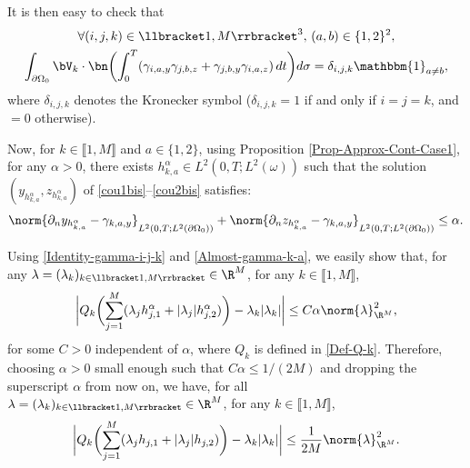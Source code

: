 It is then easy to check that
\begin{multline}
\label{Identity-gamma-i-j-k}
\forall (i,j,k) \in \llbracket 1,M \rrbracket^3, \, (a,b) \in \{1,2\}^2,
\\
\int_{\partial \Omega_0} \bV_k \cdot \bn \biggl(\int_0^T (\gamma_{i,a, y} \gamma_{j,b,z} + \gamma_{j,b,y} \gamma_{i,a,z}) \, dt \biggr) d \sigma
= \delta_{i,j,k} \mathbbm{1}_{a \neq b},
\end{multline}
where $ \delta_{i,j,k}$ denotes {the Kronecker symbol ($\delta_{i,j,k} = 1$ if and only if $i = j = k$, and $=0$ otherwise).}

Now, for $k \in \llbracket 1,M \rrbracket $ and $a \in \{1, 2\}$, using Proposition \ref{Prop-Approx-Cont-Case1}, for any ${\alpha} >0$, there \hbox{exists} $h_{k,a}^{{\alpha}}\!\in\!L^2(0,T; L^2(\omega))$ such that the solution $(y_{h_{k,a}^{\alpha}}, z_{h_{k,a}^{\alpha}})$ of \eqref{cou1bis}--\eqref{cou2bis} satisfies:
\begin{equation}
\label{Almost-gamma-k-a}
\norm{\partial_n y_{h_{k,a}^{\alpha}} - \gamma_{k,a,y}}_{L^2(0,T; L^2(\partial \Omega_0))}
+
\norm{\partial_n z_{h_{k,a}^{\alpha}} - \gamma_{k,a,y}}_{L^2(0,T; L^2(\partial \Omega_0))}
\leq
{\alpha}.
\end{equation}

Using \eqref{Identity-gamma-i-j-k} and \eqref{Almost-gamma-k-a}, we easily show that, for any $\lambda = (\lambda_{k})_{k \in \llbracket 1,M \rrbracket } \in \R^{M}$, for any $k \in \llbracket 1,M \rrbracket $,
\[
\biggl|
Q_k \biggl(\sum_{j = 1}^M (\lambda_{j} h_{j,1}^{\alpha} + |\lambda_{j}| h_{j,2}^{\alpha}) \biggr)
-
\lambda_k |\lambda_k|
\biggr|
\leq
C {\alpha} \norm{\lambda}_{\R^M}^2,
\]
for some $C >0$ independent of ${\alpha}$, where $Q_k$ is defined in \eqref{Def-Q-k}. Therefore, choosing ${\alpha} >0$ small enough such that $C {\alpha} \leq 1/(2M)$ and dropping the superscript ${\alpha}$ from now on, we have, for all $\lambda = (\lambda_{k})_{k \in \llbracket 1,M \rrbracket } \in \R^{M}$, for any $k \in \llbracket 1,M \rrbracket $,
\begin{equation}
\label{Key-Estimate-Q-k}
\biggl|
Q_k \biggl(\sum_{j = 1}^M (\lambda_{j} h_{j,1} + |\lambda_{j}| h_{j,2}) \biggr)
-
\lambda_k |\lambda_k|
\biggr|
\leq
\frac{1}{2M} \norm{\lambda}_{\R^M}^2.
\end{equation}

